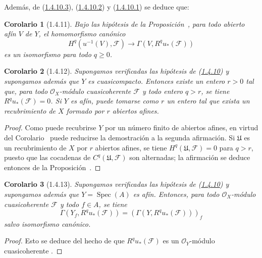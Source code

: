 \documentclass[10pt,oneside,openany]{book}
\theoremstyle{egaenv}\newtheorem*{env}{---}
\theoremstyle{egastatement}
\newtheorem*{corollary}{Corolario}
\theoremstyle{egadescription}
\renewcommand{\geq}{\geqslant}
\begin{document}
Además, de (\hyperref[III.1.4.10.3]{1.4.10.3}), (\hyperref[III.1.4.10.2]{1.4.10.2}) y (\hyperref[III.1.4.10.1]{1.4.10.1}) se deduce que:
\begin{corollary}[1.4.11]
\label{III.1.4.11}
\label{III.1.4.11-fr}
Bajo las hipótesis de la Proposición~\textup{}, para todo abierto afín $V$ de $Y$, el homomorfismo canónico
\begin{equation}
\label{III.1.4.11.1-fr}
\tag{1.4.11.1}
H^q(u^{-1}(V),\mathcal F)\longrightarrow
\Gamma(V,R^qu_*(\mathcal F))
\end{equation}
es un isomorfismo para todo $q\geq0$.
\end{corollary}

\begin{corollary}[1.4.12]
\label{III.1.4.12-fr}
Supongamos verificadas las hipótesis de \textup{(\hyperref[III.1.4.10-fr]{1.4.10})} y supongamos además que $Y$ es cuasicompacto.
Entonces existe un entero $r>0$ tal que, para todo $\mathcal O_X$-módulo cuasicoherente $\mathcal F$ y todo entero $q>r$, se tiene $R^qu_*(\mathcal F)=0$.
Si $Y$ es afín, puede tomarse como $r$ un entero tal que exista un recubrimiento de $X$ formado por $r$ abiertos afines.
\end{corollary}

\begin{proof}
Como puede recubrirse $Y$ por un número finito de abiertos afines, en virtud del Corolario~ puede reducirse la demostración a la segunda afirmación.
Si $\mathfrak U$ es un recubrimiento de $X$ por $r$ abiertos afines, se tiene $H^q(\mathfrak U,\mathcal F)=0$ para $q>r$, puesto que las cocadenas de $C^q(\mathfrak U,\mathcal F)$ son alternadas; la afirmación se deduce entonces de la Proposición~.
\end{proof}

\begin{corollary}[1.4.13]
\label{III.1.4.13-fr}
Supongamos verificadas las hipótesis de \textup{(\hyperref[III.1.4.10-fr]{1.4.10})} y supongamos además que $Y=\operatorname{Spec}(A)$ es afín.
Entonces, para todo $\mathcal O_X$-módulo cuasicoherente $\mathcal F$ y todo $f\in A$, se tiene
\[
\Gamma(Y_f,R^qu_*(\mathcal F))
=(\Gamma(Y,R^qu_*(\mathcal F)))_f
\]
salvo isomorfismo canónico.
\end{corollary}

\begin{proof}
Esto se deduce del hecho de que $R^qu_*(\mathcal F)$ es un $\mathcal O_Y$-módulo cuasicoherente .
\end{proof}
\end{document}
